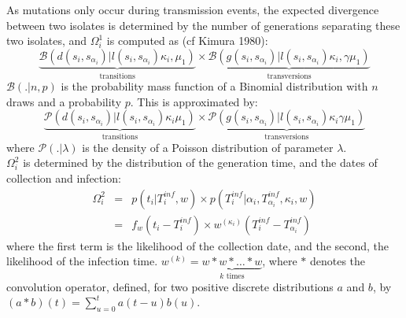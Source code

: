 \documentclass[10pt]{article}
\begin{document}
As mutations only occur during transmission events, the expected divergence between two isolates is determined by the number of generations separating these two isolates, and $\Omega_i^1$ is computed as (cf Kimura 1980): 
\begin{equation}
\underbrace{\mathcal{B}\left(d(s_i,s_{\alpha_i}) | l(s_i,s_{\alpha_i}) \kappa_i, \mu_1 \right)}_{\mbox{transitions}}
\times 
\underbrace{\mathcal{B}\left(g(s_i,s_{\alpha_i}) | l(s_i,s_{\alpha_i}) \kappa_i, \gamma \mu_1 \right)}_{\mbox{transversions}}
\end{equation}
% 
$\mathcal{B}(. | n, p)$ is the probability mass function of a Binomial distribution with $n$ draws and a probability $p$.
This is approximated by:
\begin{equation}
 \underbrace{\mathcal{P}\left(d(s_i,s_{\alpha_i}) | l(s_i,s_{\alpha_i}) \kappa_i \mu_1 \right)}_{\mbox{transitions}}
 \times 
 \underbrace{\mathcal{P}\left(g(s_i,s_{\alpha_i}) | l(s_i,s_{\alpha_i}) \kappa_i \gamma \mu_1 \right)}_{\mbox{transversions}}
 \end{equation}
where $\mathcal{P}(. | \lambda)$ is the density of a Poisson distribution of parameter $\lambda$.
~\\





$\Omega_i^2$ is determined by the distribution of the generation time, and the dates of collection and infection:
\begin{eqnarray}
 \Omega_i^2 & = & p(t_i | T_i^{inf}, w) \times p(T_i^{inf}| \alpha_i, T_{\alpha_i}^{inf}, \kappa_i, w) \nonumber \\
& = &  f_w(t_i - T_i^{inf}) \times  w^{\left(\kappa_i\right)}(T_i^{inf} - T_{\alpha_i}^{inf})
\end{eqnarray}
where the first term is the likelihood of the collection date, and the second, the likelihood of the infection time.
$w^{\left(k\right)} = \underbrace{w*w*\ldots*w}_{k \text{ times}} $, where $*$ denotes the convolution operator, defined, for two positive discrete distributions $a$ and $b$, by $\left(a*b\right)\left(t\right) = \sum_{u=0}^{t} a\left(t-u\right)b\left(u\right)$. 
\\
\end{document}

